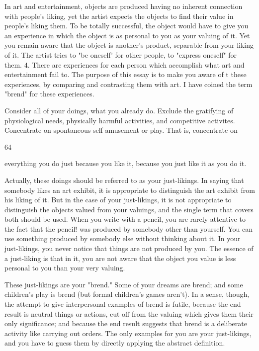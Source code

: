 \documentclass[10pt,twoside]{memoir}
\begin{document}
\begin{enumerate}
{{{{{{{{{{{{{{In art and entertainment, objects are produced having no inherent 
connection with people's liking, yet the artist expects the objects to find 
their value in people's liking them. To be totally successful, the object would 
have to give you an experience in which the object is as personal to you as 
your valuing of it. Yet you remain aware that the object is another's 
product, separable from your liking of it. The artist tries to "be oneself' for 
other people, to "express oneself" for them. 
4. There are experiences for each person which accomplish what art and 
entertainment fail to. The purpose of this essay is to make you aware of t 
these experiences, by comparing and contrasting them with art. I have 
coined the term "brend" for these experiences. 

Consider all of your doings, what you already do. Exclude the gratifying of 
physiological needs, physically harmful activities, and competitive activites. 
Concentrate on spontaneous self-amusement or play. That is, concentrate on 


64 


everything you do just because you like it, because you just like it as you do 
it. 

Actually, these doings should be referred to as your just-likings. In saying 
that somebody likes an art exhibit, it is appropriate to distinguish the art 
exhibit from his liking of it. But in the case of your just-likings, it is not 
appropriate to distinguish the objects valued from your valuings, and the 
single term that covers both should be used. When you write with a pencil, 
you are rarely attentive to the fact that the pencil! was produced by 
somebody other than yourself. You can use something produced by 
somebody else without thinking about it. In your just-likings, you never 
notice that things are not produced by you. The essence of a just-liking is 
that in it, you are not aware that the object you value is less personal to you 
than your very valuing. 

These just-likings are your "brend." Some of your dreams are brend; and 
some children's play is brend (but formal children's games aren't). In a sense, 
though, the attempt to give interpersonal examples of brend is futile, 
because the end result is neutral things or actions, cut off from the valuing 
which gives them their only significance; and because the end result suggests 
that brend is a deliberate activity like carrying out orders. The only examples 
for you are your just-likings, and you have to guess them by directly 
applying the abstract definition. 

}}}}}}}}}}}}}}
\end{enumerate}
\end{document}
